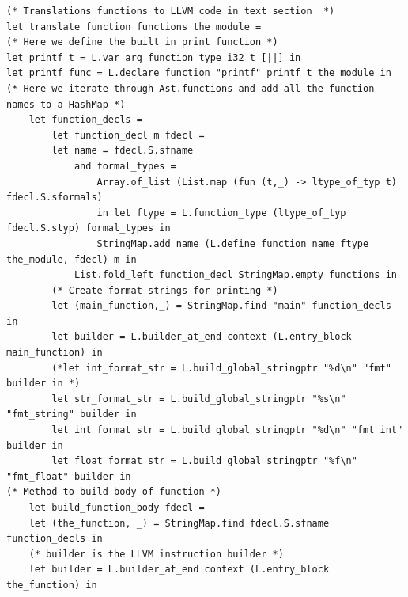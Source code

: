 \documentclass{article}
\begin{document}
\begin{lstlisting}
(* Translations functions to LLVM code in text section  *)
let translate_function functions the_module = 
(* Here we define the built in print function *)
let printf_t = L.var_arg_function_type i32_t [||] in
let printf_func = L.declare_function "printf" printf_t the_module in
(* Here we iterate through Ast.functions and add all the function names to a HashMap *)
	let function_decls =
		let function_decl m fdecl =
		let name = fdecl.S.sfname
        	and formal_types =
            	Array.of_list (List.map (fun (t,_) -> ltype_of_typ t) fdecl.S.sformals)
            	in let ftype = L.function_type (ltype_of_typ fdecl.S.styp) formal_types in
             	StringMap.add name (L.define_function name ftype the_module, fdecl) m in
    		List.fold_left function_decl StringMap.empty functions in
		(* Create format strings for printing *)
		let (main_function,_) = StringMap.find "main" function_decls in
		let builder = L.builder_at_end context (L.entry_block main_function) in
		(*let int_format_str = L.build_global_stringptr "%d\n" "fmt" builder in *)
		let str_format_str = L.build_global_stringptr "%s\n" "fmt_string" builder in
		let int_format_str = L.build_global_stringptr "%d\n" "fmt_int" builder in
		let float_format_str = L.build_global_stringptr "%f\n" "fmt_float" builder in
(* Method to build body of function *)
	let build_function_body fdecl =
	let (the_function, _) = StringMap.find fdecl.S.sfname function_decls in
	(* builder is the LLVM instruction builder *)
	let builder = L.builder_at_end context (L.entry_block the_function) in
	

\end{lstlisting}
\end{document}
